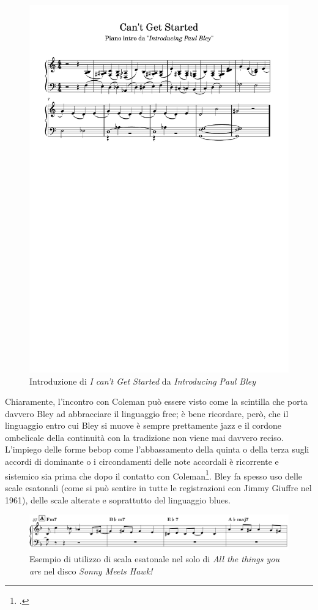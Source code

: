\begin{figure}[H]
	\centering
	\includegraphics[clip,trim=1cm 18cm 1cm 4.3cm, width=.85\textwidth]{cantgetintro.pdf}
	\caption{Introduzione di \textit{I can't Get Started} da \textit{Introducing Paul Bley}}
	\label{fig:cant}
\end{figure}
Chiaramente, l'incontro con Coleman può essere visto come la scintilla che porta davvero Bley ad abbracciare il linguaggio free; è bene ricordare, però, che il linguaggio entro cui Bley si muove è sempre prettamente jazz e il cordone ombelicale della continuità con la tradizione non viene mai davvero reciso. L'impiego delle forme bebop come l'abbassamento della quinta o della terza sugli accordi di dominante o i circondamenti delle note accordali è ricorrente e sistemico sia prima che dopo il contatto con Coleman\footcite[26]{meehan}. Bley fa spesso uso delle scale esatonali (come si può sentire in tutte le registrazioni con Jimmy Giuffre nel 1961), delle scale alterate e soprattutto del linguaggio blues.\\
\begin{figure}[h]
	\centering
	\includegraphics[width=0.9\linewidth]{screenshot001}
	\caption{Esempio di utilizzo di scala esatonale nel solo di \textit{All the things you are} nel disco \textit{Sonny Meets Hawk!}}
	\label{fig:screenshot001}
\end{figure}   
